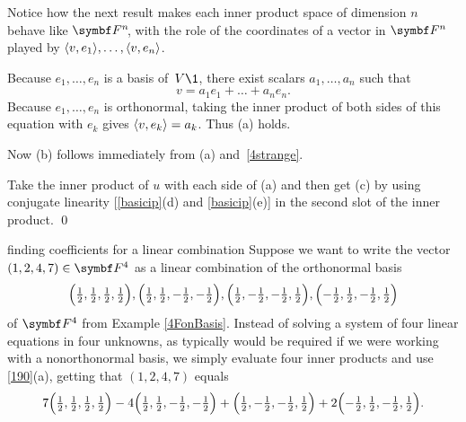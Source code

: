 
Notice how the next result makes each inner product space of dimension $n$ behave like $\FF{n}$, with the role of the \mbox{coordinates} of a vector in $\F{n}$ played by $\langle v, e_1\rangle, \ldots, \langle v, e_n\rangle$.


\proof
Because $e_1, \dots, e_n$ is a basis of~$V\1$, there exist
scalars $a_1, \dots, a_n$ such that
\[
v = a_1 e_1 + \dots + a_n e_n.
\]
Because $e_1, \dots, e_n$ is orthonormal, taking the inner product of both sides of this equation with $e_k$ gives
\mbox{$\langle v, e_k\rangle = a_k$}.  Thus (a) holds.

Now (b) follows immediately from (a) and~\ref{4strange}.

Take the inner product of $u$ with each side of (a) and then get (c) by using conjugate linearity [\ref{basicip}(d) and \ref{basicip}(e)] in the second slot of the inner product.
\qed

\begin{example}{finding coefficients for a linear combination}
Suppose we want to write the vector $(1,2,4,7) \in \F4$ as a linear combination of the orthonormal basis
\[
\paren[\Big]{\tfrac{1}{2}, \tfrac{1}{2}, \tfrac{1}{2}, \tfrac{1}{2}},
\paren[\Big]{\tfrac{1}{2}, \tfrac{1}{2}, -\tfrac{1}{2}, -\tfrac{1}{2}},
\paren[\Big]{\tfrac{1}{2}, -\tfrac{1}{2}, -\tfrac{1}{2}, \tfrac{1}{2}},
\paren[\Big]{-\tfrac{1}{2}, \tfrac{1}{2}, -\tfrac{1}{2}, \tfrac{1}{2}}
\]
of $\F4$ from Example \ref{4FonBasis}. Instead of solving a system of four linear equations in four unknowns, as typically would be required if we were working with a nonorthonormal basis, we simply evaluate four inner products and use \ref{190}(a), getting that
$(1,2,4,7)$ equals
\[
7 \paren[\Big]{\tfrac{1}{2}, \tfrac{1}{2}, \tfrac{1}{2}, \tfrac{1}{2}}
-4\paren[\Big]{\tfrac{1}{2}, \tfrac{1}{2}, -\tfrac{1}{2}, -\tfrac{1}{2}}
+\paren[\Big]{\tfrac{1}{2}, -\tfrac{1}{2}, -\tfrac{1}{2}, \tfrac{1}{2}}
+2\paren[\Big]{-\tfrac{1}{2}, \tfrac{1}{2}, -\tfrac{1}{2}, \tfrac{1}{2}}.
\]
\exampledisplayend
\end{example}

